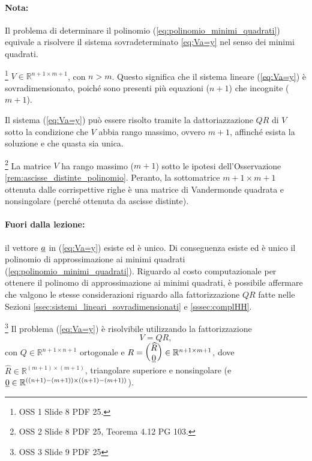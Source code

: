 \paragraph{Nota:} Il problema di determinare il polinomio (\ref{eq:polinomio_minimi_quadrati})  equivale a risolvere il sistema sovradeterminato \ref{eq:Va=y} nel senso dei minimi quadrati.

\begin{remark}
    \footnote{OSS 1 Slide 8 PDF 25.}
    $V\in\mathbb R^{n+1\times m+1}$, con $n>m$. Questo significa che il sistema lineare (\ref{eq:Va=y}) è sovradimensionato, poiché sono presenti più equazioni ($n+1$) che incognite ($m+1$).
\end{remark}

\begin{remark}
	Il sistema (\ref{eq:Va=y}) può essere risolto tramite la dattoriazzazione $QR$ di $V$ sotto la condizione che $V$ abbia rango massimo, ovvero $m+1$, affinché esista la soluzione e che quasta sia unica.
\end{remark}

\begin{remark}
    \footnote{OSS 2 Slide 8 PDF 25, Teorema 4.12 PG 103.}
    La matrice $V$ ha rango massimo ($m+1$) sotto le ipotesi dell'Osservazione \ref{rem:ascisse_distinte_polinomio}. Peranto, la sottomatrice $m+1\times m+1$ ottenuta dalle corrispettive righe è una matrice di Vandermonde quadrata e nonsingolare (perché ottenuta da ascisse distinte).
\end{remark}

\paragraph{Fuori dalla lezione:} il vettore $\uline a$ in (\ref{eq:Va=y}) esiste ed è unico. Di conseguenza esiste ed è unico il polinomio di approssimazione ai minimi quadrati (\ref{eq:polinomio_minimi_quadrati}). Riguardo al costo computazionale per ottenere il polinomo di approssimazione ai minimi quadrati, è possibile affermare che valgono le stesse considerazioni riguardo alla fattorizzazione $QR$ fatte nelle Sezioni \ref{ssec:sistemi_lineari_sovradimensionati} e \ref{sssec:complHH}.

\begin{remark}
    \footnote{OSS 3 Slide 9 PDF 25} Il problema (\ref{eq:Va=y}) è risolvibile utilizzando la fattorizzazione
    \begin{equation*}
    	V=QR,
    \end{equation*}
    con $Q\in\mathbb R^{n+1\times n+1}$ ortogonale e $R=\begin{pmatrix}\widehat R\\ \uline 0\end{pmatrix}\in\mathbb R^{n+1\times m+1}$, dove $\widehat R\in\mathbb R^{(m+1)\times (m+1)}$, triangolare superiore e nonsingolare (e $\uline 0 \in \mathbb{R}^{((n+1)-(m+1))\times ((n+1)-(m+1))}$).
\end{remark}

